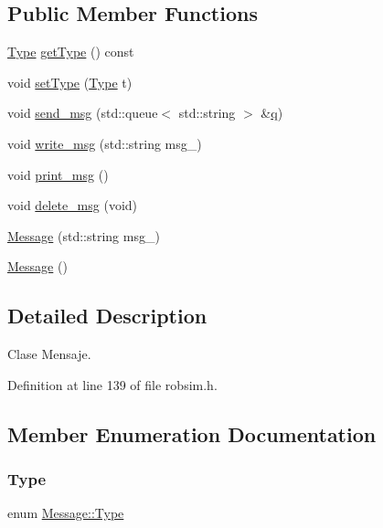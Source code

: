 \subsection*{Public Member Functions}
\begin{DoxyCompactItemize}
\item 
\hyperlink{classMessage_a1c65ab3f02ba5b175f583f9d275ecf2b}{Type} \hyperlink{classMessage_a2d91ea6e9b207fac52a616c60a5664a8}{get\+Type} () const
\item 
void \hyperlink{classMessage_acaa0b0c246dfbdd5c929911b27752b5c}{set\+Type} (\hyperlink{classMessage_a1c65ab3f02ba5b175f583f9d275ecf2b}{Type} t)
\item 
void \hyperlink{classMessage_a861344493c976ef1de90df8b464f36af}{send\+\_\+msg} (std\+::queue$<$ std\+::string $>$ \&\hyperlink{main_8cpp_ab9c1ea4772f1bf8606c9c03d8fde8004}{q})
\item 
void \hyperlink{classMessage_a9da1640bba6e0b0f63752f1927662ada}{write\+\_\+msg} (std\+::string msg\+\_\+)
\item 
void \hyperlink{classMessage_accae179a21fb486b5e830edf36f5cffc}{print\+\_\+msg} ()
\item 
void \hyperlink{classMessage_a503349764ac9e059395381da69375b5b}{delete\+\_\+msg} (void)
\item 
\hyperlink{classMessage_aa42afac737625598fc895414fbb2e332}{Message} (std\+::string msg\+\_\+)
\item 
\hyperlink{classMessage_a4fc4f717b634e66070366cb7722d7761}{Message} ()
\end{DoxyCompactItemize}


\subsection{Detailed Description}
Clase Mensaje. 

Definition at line 139 of file robsim.\+h.



\subsection{Member Enumeration Documentation}
\mbox{\label{classMessage_a1c65ab3f02ba5b175f583f9d275ecf2b}} 
\subsubsection{\texorpdfstring{Type}{Type}}
{\footnotesize\ttfamily enum \hyperlink{classMessage_a1c65ab3f02ba5b175f583f9d275ecf2b}{Message\+::\+Type}\hspace{0.3cm}{\ttfamily [strong]}}

